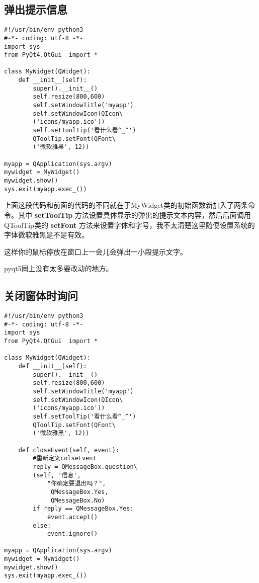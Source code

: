 \documentclass[11pt,oneside]{article}
\begin{document}
\subsection{弹出提示信息}
\label{sec:orgheadline7}
\begin{verbatim}
#!/usr/bin/env python3
#-*- coding: utf-8 -*-
import sys
from PyQt4.QtGui  import *

class MyWidget(QWidget):
    def __init__(self):
        super().__init__()
        self.resize(800,600)
        self.setWindowTitle('myapp')
        self.setWindowIcon(QIcon\
        ('icons/myapp.ico'))
        self.setToolTip('看什么看^_^')
        QToolTip.setFont(QFont\
        ('微软雅黑', 12))

myapp = QApplication(sys.argv)
mywidget = MyWidget()
mywidget.show()
sys.exit(myapp.exec_())
\end{verbatim}

上面这段代码和前面的代码的不同就在于MyWidget类的初始函数新加入了两条命令。其中 \textbf{setToolTip} 方法设置具体显示的弹出的提示文本内容，然后后面调用QToolTip类的 \textbf{setFont} 方法来设置字体和字号，我不太清楚这里随便设置系统的字体微软雅黑是不是有效。

这样你的鼠标停放在窗口上一会儿会弹出一小段提示文字。

pyqt5同上没有太多要改动的地方。

\subsection{关闭窗体时询问}
\label{sec:orgheadline8}
\begin{verbatim}
#!/usr/bin/env python3
#-*- coding: utf-8 -*-
import sys
from PyQt4.QtGui  import *

class MyWidget(QWidget):
    def __init__(self):
        super().__init__()
        self.resize(800,600)
        self.setWindowTitle('myapp')
        self.setWindowIcon(QIcon\
        ('icons/myapp.ico'))
        self.setToolTip('看什么看^_^')
        QToolTip.setFont(QFont\
        ('微软雅黑', 12))

    def closeEvent(self, event):
        #重新定义colseEvent
        reply = QMessageBox.question\
        (self, '信息',
            "你确定要退出吗？",
             QMessageBox.Yes,
             QMessageBox.No)
        if reply == QMessageBox.Yes:
            event.accept()
        else:
            event.ignore()

myapp = QApplication(sys.argv)
mywidget = MyWidget()
mywidget.show()
sys.exit(myapp.exec_())
\end{verbatim}
\end{document}
